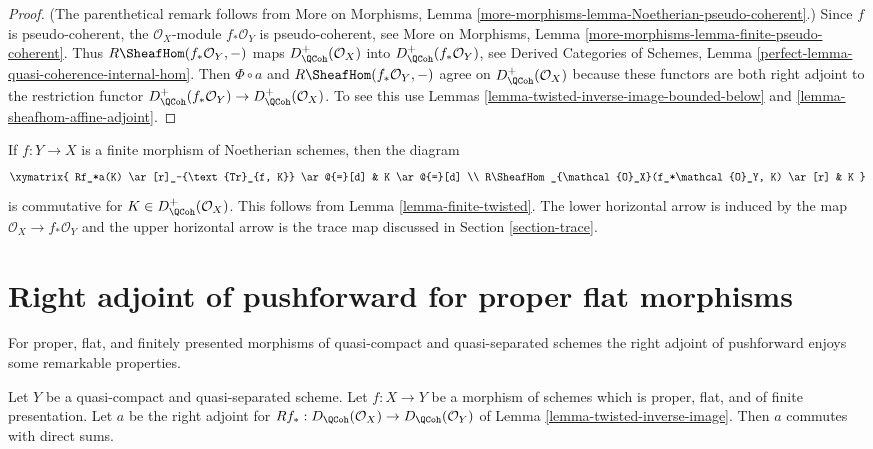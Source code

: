 \begin{proof}
(The parenthetical remark follows from More on Morphisms, Lemma
\ref{more-morphisms-lemma-Noetherian-pseudo-coherent}.)
Since $f$ is pseudo-coherent, the $\mathcal{O}_X$-module $f_*\mathcal{O}_Y$
is pseudo-coherent, see More on Morphisms, Lemma
\ref{more-morphisms-lemma-finite-pseudo-coherent}.
Thus $R\SheafHom(f_*\mathcal{O}_Y, -)$ maps
$D_\QCoh^+(\mathcal{O}_X)$ into
$D_\QCoh^+(f_*\mathcal{O}_Y)$, see
Derived Categories of Schemes, Lemma
\ref{perfect-lemma-quasi-coherence-internal-hom}.
Then $\Phi \circ a$ and $R\SheafHom(f_*\mathcal{O}_Y, -)$
agree on $D_\QCoh^+(\mathcal{O}_X)$ because these functors are
both right adjoint to the restriction functor
$D_\QCoh^+(f_*\mathcal{O}_Y) \to D_\QCoh^+(\mathcal{O}_X)$. To see this
use Lemmas \ref{lemma-twisted-inverse-image-bounded-below} and
\ref{lemma-sheafhom-affine-adjoint}.
\end{proof}

\begin{remark}
\label{remark-trace-map-finite}
If $f : Y \to X$ is a finite morphism of Noetherian schemes, then the diagram
$$
\xymatrix{
Rf_*a(K) \ar[r]_-{\text{Tr}_{f, K}} \ar@{=}[d] & K \ar@{=}[d] \\
R\SheafHom_{\mathcal{O}_X}(f_*\mathcal{O}_Y, K) \ar[r] & K
}
$$
is commutative for $K \in D_\QCoh^+(\mathcal{O}_X)$. This follows
from Lemma \ref{lemma-finite-twisted}. The lower horizontal
arrow is induced by the map $\mathcal{O}_X \to f_*\mathcal{O}_Y$ and the
upper horizontal arrow is the trace map discussed in
Section \ref{section-trace}.
\end{remark}






\section{Right adjoint of pushforward for proper flat morphisms}
\label{section-proper-flat}

\noindent
For proper, flat, and finitely presented morphisms of quasi-compact
and quasi-separated schemes the right adjoint of pushforward
enjoys some remarkable properties.

\begin{lemma}
\label{lemma-proper-flat}
Let $Y$ be a quasi-compact and quasi-separated scheme.
Let $f : X \to Y$ be a morphism of schemes which is proper, flat, and
of finite presentation.
Let $a$ be the right adjoint for
$Rf_* : D_\QCoh(\mathcal{O}_X) \to D_\QCoh(\mathcal{O}_Y)$ of
Lemma \ref{lemma-twisted-inverse-image}. Then $a$ commutes with direct sums.
\end{lemma}

